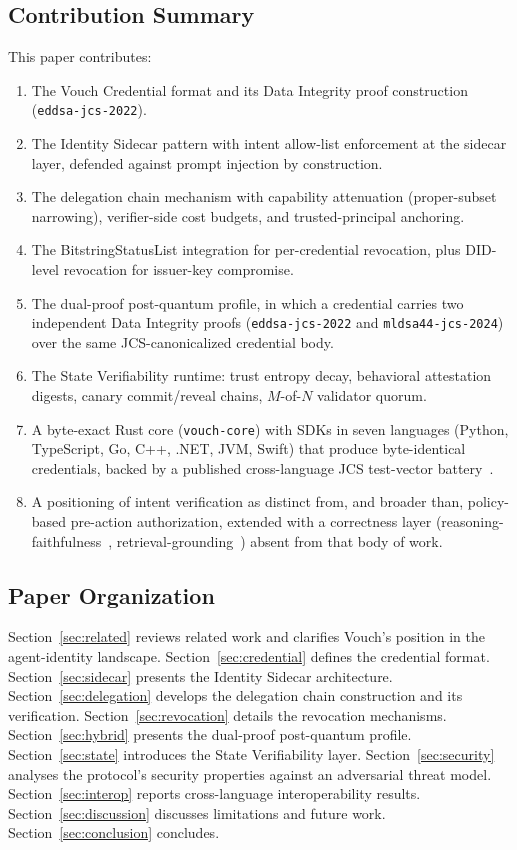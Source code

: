 \documentclass[11pt,a4paper]{article}
\begin{document}
\subsection{Contribution Summary}

This paper contributes:

\begin{enumerate}[label=\arabic*.,leftmargin=*]
\item The Vouch Credential format and its Data Integrity proof construction (\texttt{eddsa-jcs-2022}).
\item The Identity Sidecar pattern with intent allow-list enforcement at the sidecar layer, defended against prompt injection by construction.
\item The delegation chain mechanism with capability attenuation (proper-subset narrowing), verifier-side cost budgets, and trusted-principal anchoring.
\item The BitstringStatusList integration for per-credential revocation, plus DID-level revocation for issuer-key compromise.
\item The dual-proof post-quantum profile, in which a credential carries two independent Data Integrity proofs (\texttt{eddsa-jcs-2022} and \texttt{mldsa44-jcs-2024}) over the same JCS-canonicalized credential body.
\item The State Verifiability runtime: trust entropy decay, behavioral attestation digests, canary commit/reveal chains, $M$-of-$N$ validator quorum.
\item A byte-exact Rust core (\texttt{vouch-core}) with SDKs in seven languages (Python, TypeScript, Go, C++, .NET, JVM, Swift) that produce byte-identical credentials, backed by a published cross-language JCS test-vector battery~\cite{pad039}.
\item A positioning of intent verification as distinct from, and broader than, policy-based pre-action authorization, extended with a correctness layer (reasoning-faithfulness~\cite{pad017}, retrieval-grounding~\cite{pad045}) absent from that body of work.
\end{enumerate}

\subsection{Paper Organization}

Section~\ref{sec:related} reviews related work and clarifies Vouch's position in the agent-identity landscape. Section~\ref{sec:credential} defines the credential format. Section~\ref{sec:sidecar} presents the Identity Sidecar architecture. Section~\ref{sec:delegation} develops the delegation chain construction and its verification. Section~\ref{sec:revocation} details the revocation mechanisms. Section~\ref{sec:hybrid} presents the dual-proof post-quantum profile. Section~\ref{sec:state} introduces the State Verifiability layer. Section~\ref{sec:security} analyses the protocol's security properties against an adversarial threat model. Section~\ref{sec:interop} reports cross-language interoperability results. Section~\ref{sec:discussion} discusses limitations and future work. Section~\ref{sec:conclusion} concludes.
\end{document}
